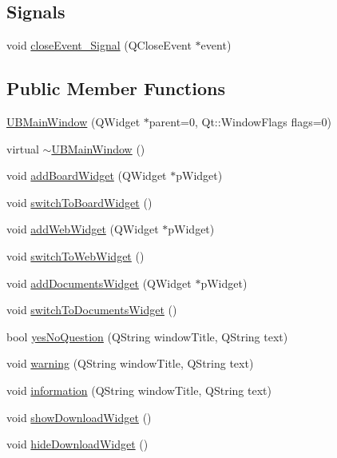 \subsection*{Signals}
\begin{DoxyCompactItemize}
\item 
void \hyperlink{class_u_b_main_window_a14588af40d18048b05e7f4261f040134}{close\-Event\-\_\-\-Signal} (Q\-Close\-Event $\ast$event)
\end{DoxyCompactItemize}
\subsection*{Public Member Functions}
\begin{DoxyCompactItemize}
\item 
\hyperlink{class_u_b_main_window_a603814523782399bc82d1c7013c356c9}{U\-B\-Main\-Window} (Q\-Widget $\ast$parent=0, Qt\-::\-Window\-Flags flags=0)
\item 
virtual \hyperlink{class_u_b_main_window_a6f4df1b80b3201a8f4fa3316b1a5d0e9}{$\sim$\-U\-B\-Main\-Window} ()
\item 
void \hyperlink{class_u_b_main_window_a811b3f7960316901f2f988fafb96fdc6}{add\-Board\-Widget} (Q\-Widget $\ast$p\-Widget)
\item 
void \hyperlink{class_u_b_main_window_a1890407abe5e433cc3c85af0d1db4d23}{switch\-To\-Board\-Widget} ()
\item 
void \hyperlink{class_u_b_main_window_ab1e1c63ece4aebb590ee3af55ba1177a}{add\-Web\-Widget} (Q\-Widget $\ast$p\-Widget)
\item 
void \hyperlink{class_u_b_main_window_ac9cca6450d4bb9e206f61305c358a864}{switch\-To\-Web\-Widget} ()
\item 
void \hyperlink{class_u_b_main_window_a621f851df90af77fbe2052327ed299dc}{add\-Documents\-Widget} (Q\-Widget $\ast$p\-Widget)
\item 
void \hyperlink{class_u_b_main_window_abf3656d99f6c694bd38bb51fe6ee4252}{switch\-To\-Documents\-Widget} ()
\item 
bool \hyperlink{class_u_b_main_window_a4e2df10066f36d2040fca0feb192a5d8}{yes\-No\-Question} (Q\-String window\-Title, Q\-String text)
\item 
void \hyperlink{class_u_b_main_window_a626ff5fff445ccfd8feffa11390a3963}{warning} (Q\-String window\-Title, Q\-String text)
\item 
void \hyperlink{class_u_b_main_window_a653d248fb5b159abdf4d30b7cbf6e490}{information} (Q\-String window\-Title, Q\-String text)
\item 
void \hyperlink{class_u_b_main_window_ae2949414a83e39ea1e86ed36dd875cb8}{show\-Download\-Widget} ()
\item 
void \hyperlink{class_u_b_main_window_a4b99a4654dccfb65a5599c9fb8d3fb8a}{hide\-Download\-Widget} ()
\end{DoxyCompactItemize}
